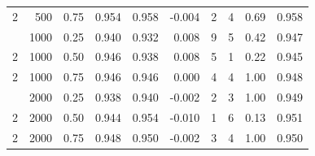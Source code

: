 \begin{table}[t]
\begin{tabular}{rrr rr r rr r r}
2 & 500 & 0.75 & 0.954 & 0.958 & -0.004 & 2 & 4 & 0.69 & 0.958 \\
\addlinespace
2 & 1000 & 0.25 & 0.940 & 0.932 & 0.008 & 9 & 5 & 0.42 & 0.947 \\
2 & 1000 & 0.50 & 0.946 & 0.938 & 0.008 & 5 & 1 & 0.22 & 0.945 \\
2 & 1000 & 0.75 & 0.946 & 0.946 & 0.000 & 4 & 4 & 1.00 & 0.948 \\
\addlinespace
2 & 2000 & 0.25 & 0.938 & 0.940 & -0.002 & 2 & 3 & 1.00 & 0.949 \\
2 & 2000 & 0.50 & 0.944 & 0.954 & -0.010 & 1 & 6 & 0.13 & 0.951 \\
2 & 2000 & 0.75 & 0.948 & 0.950 & -0.002 & 3 & 4 & 1.00 & 0.950 \\
\bottomrule\end{tabular}\end{table}

